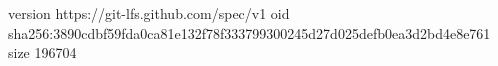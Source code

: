 version https://git-lfs.github.com/spec/v1
oid sha256:3890cdbf59fda0ca81e132f78f333799300245d27d025defb0ea3d2bd4e8e761
size 196704
